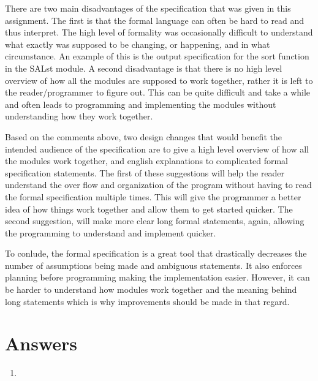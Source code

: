 \documentclass[12pt]{article}
\begin{document}
There are two main disadvantages of the specification that was given in this
assignment. The first is that the formal language can often be hard to read
and thus interpret. The high level of formality was occasionally difficult
to understand what exactly was supposed to be changing, or happening, and in
what circumstance. An example of this is the output specification for the
sort function in the SALst module. A second disadvantage is that there is no
high level overview of how all the modules are supposed to work together,
rather it is left to the reader/programmer to figure out. This can be
quite difficult and take a while and often leads to programming and implementing
the modules without understanding how they work together.

Based on the comments above, two design changes that would benefit the
intended audience of the specification are to give a high level overview
of how all the modules work together, and english explanations to complicated
formal specification statements. The first of these suggestions will help
the reader understand the over flow and organization of the program without
having to read the formal specification multiple times. This will give the
programmer a better idea of how things work together and allow them to get
started quicker. The second suggestion, will make more clear long formal
statements, again, allowing the programming to understand and implement
quicker.

To conlude, the formal specification is a great tool that drastically
decreases the number of assumptions being made and ambiguous statements.
It also enforces planning before programming making the implementation easier.
However, it can be harder to understand how modules work together and the meaning
behind long statements which is why improvements should be made in that regard.

\section{Answers}

\begin{enumerate}

\item 

\end{enumerate}

\newpage

\lstset{language=Python, basicstyle=\tiny, breaklines=true, showspaces=false,
  showstringspaces=false, breakatwhitespace=true}
\end{document}
